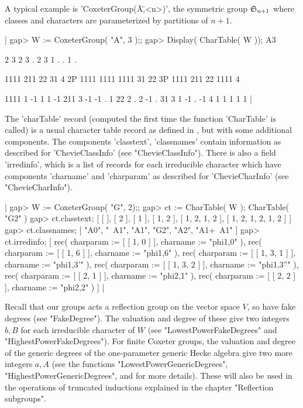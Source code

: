 A  typical example  is  'CoxeterGroup(\"A\",<n>)',  the symmetric  group
${\mathfrak S}_{n+1}$ where classes and characters are parameterized by partitions
of $n+1$.

|    gap> W := CoxeterGroup( "A", 3 );;
    gap> Display( CharTable( W ));
    A3
    
          2    3    2    3    .  2
          3    1    .    .    1  .
    
            1111  211   22   31  4
         2P 1111 1111 1111   31 22
         3P 1111  211   22 1111  4
    
    1111       1   -1    1    1 -1
    211        3   -1   -1    .  1
    22         2    .    2   -1  .
    31         3    1   -1    . -1
    4          1    1    1    1  1
    |

The 'charTable' record (computed the first time the function 'CharTable'
is  called) is  a  usual  character table  record  as  defined in  \GAP,
but  with  some  additional   components.  The  components  'classtext',
'classnames' contain information as described for 'ChevieClassInfo' (see
"ChevieClassInfo").  There  is also  a  field  'irredinfo', which  is  a
list of  records for  each irreducible  character which  have components
'charname'  and  'charparam'  as  described  for  'ChevieCharInfo'  (see
"ChevieCharInfo").

|    gap> W := CoxeterGroup( "G", 2);;
    gap> ct := CharTable( W );
    CharTable( "G2" )
    gap> ct.classtext;
    [ [  ], [ 2 ], [ 1 ], [ 1, 2 ], [ 1, 2, 1, 2 ], [ 1, 2, 1, 2, 1, 2 ] ]
    gap> ct.classnames;
    [ "A0", "~A1", "A1", "G2", "A2", "A1+~A1" ]
    gap> ct.irredinfo;
    [ rec(
          charparam := [ [ 1, 0 ] ],
          charname := "phi{1,0}" ), rec(
          charparam := [ [ 1, 6 ] ],
          charname := "phi{1,6}" ), rec(
          charparam := [ [ 1, 3, 1 ] ],
          charname := "phi{1,3}'" ), rec(
          charparam := [ [ 1, 3, 2 ] ],
          charname := "phi{1,3}''" ), rec(
          charparam := [ [ 2, 1 ] ],
          charname := "phi{2,1}" ), rec(
          charparam := [ [ 2, 2 ] ],
          charname := "phi{2,2}" ) ] |

Recall  that our groups acts a reflection group on the vector space $V$, so
have  fake degrees  (see "FakeDegree").  The valuation  and degree of these
give  two  integers  $b,B$  for  each  irreducible  character  of  $W$ (see
"LowestPowerFakeDegrees" and "HighestPowerFakeDegrees"). For finite Coxeter
groups,   the  valuation  and   degree  of  the   generic  degrees  of  the
one-parameter  generic Hecke algebra give two  more integers $a,A$ (see the
functions  "LowestPowerGenericDegrees",  "HighestPowerGenericDegrees",  and
\cite[Ch.11]  {Car85} for  more details).  These will  also be  used in the
operations  of truncated  inductions explained  in the  chapter "Reflection
subgroups".

